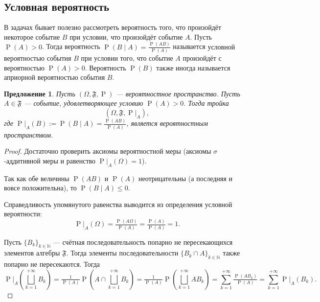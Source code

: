 \documentclass[12pt]{article}
\newtheorem{proposition}{Предложение}
\numberwithin{theorem}{section}
\numberwithin{proposition}{section}
\theoremstyle{definition}
\newcommand{\prob}{\operatorname{P}}
\newcommand{\defin}[2]{\hypertarget{#2}{{\color{red} #1}}}
\newcommand{\events}{\mathfrak{F}}
\begin{document}
	\subsection{Условная вероятность}
	
	В задачах бывает полезно рассмотреть вероятность того, что произойдёт некоторое событие $ B $ при условии, 
	что произойдёт событие $ A $. Пусть $ \prob(A) > 0 $. Тогда вероятность $ \prob(B \mid A) = \tfrac{\prob(AB)}{\prob(A)} $
	называется \defin{условной вероятностью события $ B $ при условии того, 
	что событие $ A $ произойдёт с вероятностью $ \prob(A) > 0 $}{conditional}.
	Вероятность $ \prob(B) $ также иногда называется \defin{априорной вероятностью события $ B $}{apriori}.
		
	\begin{proposition}
		Пусть $ (\Omega, \events, \prob) $ --- вероятностное пространство.
		Пусть $ {A \in \events} $ --- событие, удовлетворяющее условию $ \prob(A) > 0 $.
		Тогда тройка $$ (\Omega, \events, \left.\prob\right|_{A}), $$
		где $ \left.\prob\right|_{A}(B) := \prob(B \mid A) = \tfrac{\prob(AB)}{\prob(A)} $,
		является вероятностным пространством.
	\end{proposition}
	
	\begin{proof}
		Достаточно проверить аксиомы вероятностной меры 
		(аксиомы $ \sigma $-аддитивной меры и равенство $ \left.\prob\right|_{A}(\Omega) = 1 $).
		
		Так как обе величины $ \prob(AB) $ и $ \prob(A) $ неотрицательны (а последняя и вовсе положительна),
		то $ \prob(B \mid A) \leqslant 0 $.
		
		Справедливость упомянутого равенства выводится из определения условной вероятности: 
		$$ \left.\prob\right|_{A}(\Omega) = \tfrac{\prob(A\Omega)}{\prob(A)} = \tfrac{\prob(A)}{\prob(A)} = 1. $$
		
		Пусть $ \{B_k\}_{k \in \mathbb{N}} $ --- 
		счётная последовательность попарно не пересекающихся элементов алгебры $ \events $. 
		Тогда элементы последовательности $ \{B_k \cap A\}_{k \in \mathbb{N}} $ также попарно не пересекаются.
		Тогда
		$$ \left.\prob\right|_{A}\left(\bigsqcup\limits_{k = 1}^{+\infty} B_k \right)
		= \tfrac{1}{\prob(A)}\prob\left(A \cap \bigsqcup\limits_{k = 1}^{+\infty} B_k \right)
		= \tfrac{1}{\prob(A)}\prob\left(\bigsqcup\limits_{k = 1}^{+\infty} AB_k \right)
		= \sum\limits_{k = 1}^{+\infty} \tfrac{\prob(AB_k)}{\prob(A)} 
		= \sum\limits_{k = 1}^{+\infty} \left.\prob\right|_{A}(B_k). $$
	\end{proof}
	
\end{document}
